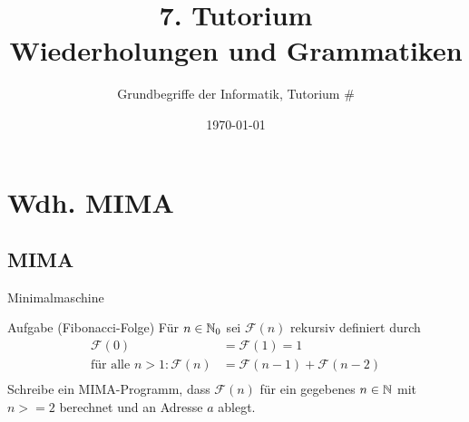 




\title[Grammatiken]{7. Tutorium\\ Wiederholungen und Grammatiken}
\subtitle{Grundbegriffe der Informatik, Tutorium \#\mytutnumber}
\date{\today}


\titleframe
\roadmap

\section{Wdh. MIMA}
\subsection{MIMA}
\begin{frame}{Minimalmaschine}
	\begin{exampleblock}{Aufgabe (Fibonacci-Folge)}
		Für $n \in \mathbb{N}_0$ sei $\mathcal{F}(n)$ rekursiv definiert durch\\
		\begin{align*}
			 \mathcal{F}(0) &=  \mathcal{F}(1) = 1\\
			\text{für alle }n>1: \mathcal{F}(n) &= \mathcal{F}(n-1) + \mathcal{F}(n-2)\\
		\end{align*}
		Schreibe ein MIMA-Programm, dass $\mathcal{F}(n)$ für ein gegebenes $n \in \mathbb{N}$ mit $n>=2$ berechnet und an Adresse $a$ ablegt.
	\end{exampleblock}
\end{frame}
	
